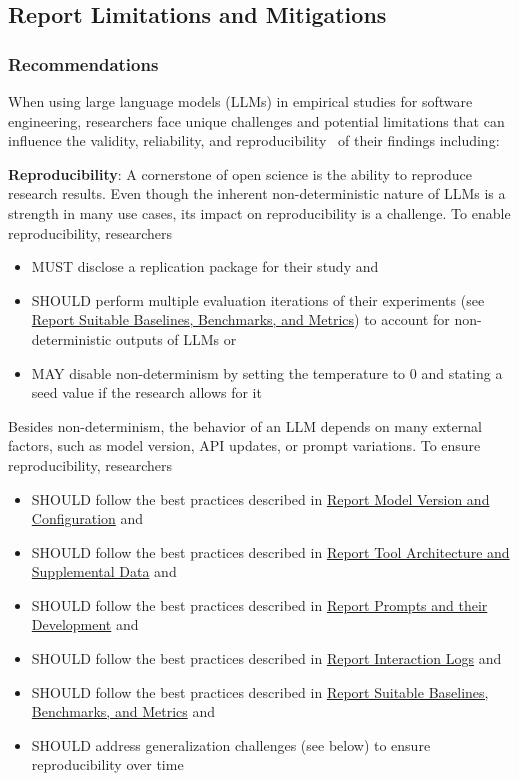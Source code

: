 



\subsection{Report Limitations and Mitigations}

\subsubsection{Recommendations}
When using large language models (LLMs) in empirical studies for software engineering, researchers face unique challenges and potential limitations that can influence the validity, reliability, and reproducibility~\cite{sallou2024breaking} of their findings including:

\textbf{Reproducibility}:
A cornerstone of open science is the ability to reproduce research results. Even though the inherent non-deterministic nature of LLMs is a strength in many use cases, its impact on reproducibility is a challenge. To enable reproducibility, researchers 
\begin{itemize}
  \item MUST disclose a replication package for their study and
  \item SHOULD perform multiple evaluation iterations of their experiments (see \href{/guidelines/report-baselines-benchmarks-and-metrics}{Report Suitable Baselines, Benchmarks, and Metrics}) to account for non-deterministic outputs of LLMs or
  \item MAY disable non-determinism by setting the temperature to 0 and stating a seed value if the research allows for it
\end{itemize}
Besides non-determinism, the behavior of an LLM depends on many external factors, such as model version, API updates, or prompt variations. To ensure reproducibility, researchers
\begin{itemize}
  \item SHOULD follow the best practices described in \href{/guidelines/report-version-and-configuration}{Report Model Version and Configuration} and
  \item SHOULD follow the best practices described in \href{/guidelines/report-architecture-and-data}{Report Tool Architecture and Supplemental Data} and
  \item SHOULD follow the best practices described in \href{/guidelines/report-prompts}{Report Prompts and their Development} and
  \item SHOULD follow the best practices described in \href{/guidelines/report-interaction-logs}{Report Interaction Logs} and
  \item SHOULD follow the best practices described in \href{/guidelines/report-baselines-benchmarks-and-metrics}{Report Suitable Baselines, Benchmarks, and Metrics} and
  \item SHOULD address generalization challenges (see below) to ensure reproducibility over time
\end{itemize}

